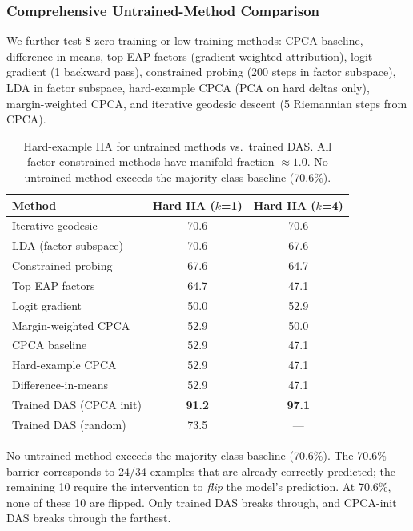\documentclass[11pt]{article}
\begin{document}
\subsubsection{Comprehensive Untrained-Method Comparison}

We further test 8 zero-training or low-training methods:
CPCA baseline, difference-in-means, top EAP factors (gradient-weighted
attribution), logit gradient (1 backward pass), constrained probing
(200 steps in factor subspace), LDA in factor subspace, hard-example
CPCA (PCA on hard deltas only), margin-weighted CPCA, and iterative
geodesic descent (5 Riemannian steps from CPCA).

\begin{table}[h!]
\centering
\small
\caption{Hard-example IIA for untrained methods vs.\ trained DAS.
All factor-constrained methods have manifold fraction $\approx 1.0$.
No untrained method exceeds the majority-class baseline (70.6\%).}
\label{tab:untrained-methods}
\begin{tabular}{lcc}
\hline
\textbf{Method} & \textbf{Hard IIA ($k$=1)} & \textbf{Hard IIA ($k$=4)} \\
\hline
Iterative geodesic      & 70.6 & 70.6 \\
LDA (factor subspace)   & 70.6 & 67.6 \\
Constrained probing     & 67.6 & 64.7 \\
Top EAP factors         & 64.7 & 47.1 \\
Logit gradient          & 50.0 & 52.9 \\
Margin-weighted CPCA    & 52.9 & 50.0 \\
CPCA baseline           & 52.9 & 47.1 \\
Hard-example CPCA       & 52.9 & 47.1 \\
Difference-in-means     & 52.9 & 47.1 \\
\hline
Trained DAS (CPCA init) & \textbf{91.2} & \textbf{97.1} \\
Trained DAS (random)    & 73.5 & --- \\
\hline
\end{tabular}
\end{table}

No untrained method exceeds the majority-class baseline (70.6\%).
The 70.6\% barrier corresponds to 24/34 examples that are already
correctly predicted; the remaining 10 require the intervention to
\emph{flip} the model's prediction. At 70.6\%, none of these 10 are
flipped. Only trained DAS breaks through, and CPCA-init DAS breaks
through the farthest.
\end{document}
